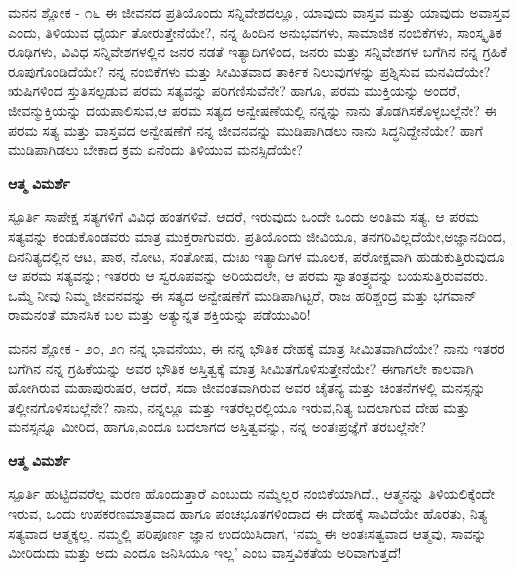 \newpage
\begin{mananam}{\mananamfont \large ಮನನ ಶ್ಲೋಕ - ೧೬}
\footnotesize \mananamtext ಈ ಜೀವನದ ಪ್ರತಿಯೊಂದು ಸನ್ನಿವೇಶದಲ್ಲೂ, ಯಾವುದು ವಾಸ್ತವ ಮತ್ತು ಯಾವುದು ಅವಾಸ್ತವ ಎಂದು, ತಿಳಿಯುವ ಧೈರ್ಯ ತೋರುತ್ತೇನೆಯೇ?, ನನ್ನ ಹಿಂದಿನ ಅನುಭವಗಳು, ಸಾಮಾಜಿಕ ನಂಬಿಕೆಗಳು, ಸಾಂಸ್ಕೃತಿಕ ರೂಢಿಗಳು, ವಿವಿಧ ಸನ್ನಿವೇಶಗಳಲ್ಲಿನ ಜನರ ನಡತೆ ಇತ್ಯಾದಿಗಳಿಂದ, ಜನರು ಮತ್ತು ಸನ್ನಿವೇಶಗಳ ಬಗೆಗಿನ ನನ್ನ ಗ್ರಹಿಕೆ ರೂಪುಗೊಂಡಿದೆಯೇ? ನನ್ನ ನಂಬಿಕೆಗಳು ಮತ್ತು ಸೀಮಿತವಾದ ತಾರ್ಕಿಕ ನಿಲುವುಗಳನ್ನು ಪ್ರಶ್ನಿಸುವ ಮನವಿದೆಯೇ? ಋಷಿಗಳಿಂದ ಸ್ತುತಿಸಲ್ಪಡುವ ಪರಮ ಸತ್ಯವನ್ನು ಪರಿಗಣಿಸುವೆನೇ? ಹಾಗೂ, ಪರಮ ಮುಕ್ತಿಯನ್ನು ಅಂದರೆ, ಜೀವನ್ಮುಕ್ತಿಯನ್ನು ದಯಪಾಲಿಸುವ,ಆ ಪರಮ ಸತ್ಯದ ಅನ್ವೇಷಣೆಯಲ್ಲಿ ನನ್ನನ್ನು ನಾನು ತೊಡಗಿಸಕೊಳ್ಳಬಲ್ಲೆನೇ? ಈ ಪರಮ ಸತ್ಯ ಮತ್ತು ವಾಸ್ತವದ ಅನ್ವೇಷಣೆಗೆ ನನ್ನ ಜೀವನವನ್ನು ಮುಡಿಪಾಗಿಡಲು ನಾನು ಸಿದ್ಧನಿದ್ದೇನೆಯೇ? ಹಾಗೆ ಮುಡಿಪಾಗಿಡಲು ಬೇಕಾದ ಕ್ರಮ ಏನೆಂದು ತಿಳಿಯುವ ಮನಸ್ಸಿದೆಯೇ?
\end{mananam}
\WritingHand\enspace\textbf{ಆತ್ಮ ವಿಮರ್ಶೆ}
\begin{inspiration}{\mananamfont \large ಸ್ಪೂರ್ತಿ}
\footnotesize \mananamtext ಸಾಪೇಕ್ಷ ಸತ್ಯಗಳಿಗೆ ವಿವಿಧ ಹಂತಗಳಿವೆ. ಆದರೆ, ಇರುವುದು ಒಂದೇ ಒಂದು ಅಂತಿಮ ಸತ್ಯ. ಆ ಪರಮ ಸತ್ಯವನ್ನು ಕಂಡುಕೊಂಡವರು ಮಾತ್ರ ಮುಕ್ತರಾಗುವರು. ಪ್ರತಿಯೊಂದು ಜೀವಿಯೂ, ತನಗರಿವಿಲ್ಲದೆಯೇ,ಅಜ್ಞಾನದಿಂದ, ದಿನನಿತ್ಯದಲ್ಲಿನ ಆಟ, ಪಾಠ, ನೋಟ, ಸಂತೋಷ, ದುಃಖ ಇತ್ಯಾದಿಗಳ ಮೂಲಕ, ಪರೋಕ್ಷವಾಗಿ ಹುಡುಕುತ್ತಿರುವುದೂ ಆ ಪರಮ ಸತ್ಯವನ್ನು; ಇತರರು ಆ ಸ್ವರೂಪವನ್ನು ಅರಿಯದಲೇ, ಆ ಪರಮ ಸ್ವಾತಂತ್ರ್ಯವನ್ನು ಬಯಸುತ್ತಿರುವವರು. ಒಮ್ಮೆ ನೀವು ನಿಮ್ಮ ಜೀವನವನ್ನು ಈ ಸತ್ಯದ ಅನ್ವೇಷಣೆಗೆ ಮುಡಿಪಾಗಿಟ್ಟರೆ, ರಾಜ ಹರಿಶ್ಚಂದ್ರ ಮತ್ತು ಭಗವಾನ್ ರಾಮನಂತೆ ಮಾನಸಿಕ ಬಲ ಮತ್ತು ಅತ್ಯುನ್ನತ ಶಕ್ತಿಯನ್ನು ಪಡೆಯುವಿರಿ!
\end{inspiration}

\newpage
\begin{mananam}{\mananamfont \large {ಮನನ ಶ್ಲೋಕ - ೨೦, ೨೧}}
\footnotesize \mananamtext ನನ್ನ ಭಾವನೆಯು, ಈ ನನ್ನ ಭೌತಿಕ ದೇಹಕ್ಕೆ ಮಾತ್ರ ಸೀಮಿತವಾಗಿದೆಯೇ? ನಾನು ಇತರರ ಬಗೆಗಿನ ನನ್ನ ಗ್ರಹಿಕೆಯನ್ನು ಅವರ ಭೌತಿಕ ಅಸ್ತಿತ್ವಕ್ಕೆ ಮಾತ್ರ ಸೀಮಿತಗೊಳಿಸುತ್ತೇನೆಯೇ? ಈಗಾಗಲೇ ಕಾಲವಾಗಿ ಹೋಗಿರುವ ಮಹಾಪುರುಷರ, ಆದರೆ, ಸದಾ ಜೀವಂತವಾಗಿರುವ ಅವರ ಚೈತನ್ಯ ಮತ್ತು ಚಿಂತನೆಗಳಲ್ಲಿ ಮನಸ್ಸನ್ನು ತಲ್ಲೀನಗೊಳಿಸಬಲ್ಲೆನೇ? ನಾನು, ನನ್ನಲ್ಲೂ ಮತ್ತು ಇತರೆಲ್ಲರಲ್ಲಿಯೂ ಇರುವ,ನಿತ್ಯ ಬದಲಾಗುವ ದೇಹ ಮತ್ತು ಮನಸ್ಸನ್ನೂ ಮೀರಿದ, ಹಾಗೂ,ಎಂದೂ ಬದಲಾಗದ ಅಸ್ತಿತ್ವವನ್ನು, ನನ್ನ ಅಂತಃಪ್ರಜ್ಞೆಗೆ ತರಬಲ್ಲೆನೇ?
\end{mananam}
\WritingHand\enspace\textbf{ಆತ್ಮ ವಿಮರ್ಶೆ}
\begin{inspiration}{\mananamfont \large ಸ್ಪೂರ್ತಿ}
\footnotesize \mananamtext ಹುಟ್ಟಿದವರೆಲ್ಲ ಮರಣ ಹೊಂದುತ್ತಾರೆ ಎಂಬುದು ನಮ್ಮೆಲ್ಲರ ನಂಬಿಕೆಯಾಗಿದೆ., ಆತ್ಮನನ್ನು ತಿಳಿಯಲಿಕ್ಕೆಂದೇ ಇರುವ, ಒಂದು ಉಪಕರಣಮಾತ್ರವಾದ ಹಾಗೂ ಪಂಚಭೂತಗಳಿಂದಾದ ಈ ದೇಹಕ್ಕೆ ಸಾವಿದೆಯೇ ಹೊರತು, ನಿತ್ಯ ಸತ್ಯವಾದ ಆತ್ಮಕ್ಕಲ್ಲ. ನಮ್ಮಲ್ಲಿ ಪರಿಪೂರ್ಣ ಜ್ಞಾನ ಉದಯಿಸಿದಾಗ, ‘ನಮ್ಮ ಈ ಅಂತಃಸತ್ವವಾದ ಆತ್ಮವು, ಸಾವನ್ನು ಮೀರಿದುದು ಮತ್ತು ಅದು ಎಂದೂ ಜನಿಸಿಯೂ ಇಲ್ಲ’ ಎಂಬ ವಾಸ್ತವಿಕತೆಯ ಅರಿವಾಗುತ್ತದೆ!
\end{inspiration}
\newpage



